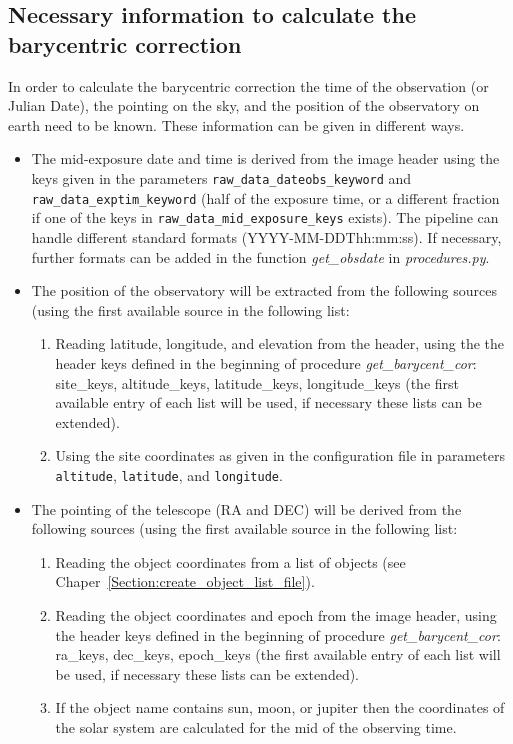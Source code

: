 \documentclass[10pt,a4paper]{article}
\begin{document}
\subsection{Necessary information to calculate the barycentric correction}
\label{Section:barycentric_correction}
In order to calculate the barycentric correction the time of the observation (or Julian Date), the pointing on the sky, and the position of the observatory on earth need to be known. These information can be given in different ways. 

\begin{itemize}
 \item The mid-exposure date and time is derived from the image header using the keys given in the parameters \verb|raw_data_dateobs_keyword| and \verb|raw_data_exptim_keyword| (half of the exposure time, or a different fraction if one of the keys in \verb|raw_data_mid_exposure_keys| exists). The pipeline can handle different standard formats (YYYY-MM-DDThh:mm:ss). If necessary, further formats can be added in the function \textit{get\_obsdate} in \textit{procedures.py}.
 \item The position of the observatory will be extracted from the following sources (using the first available source in the following list:
 \begin{enumerate}\setlength\itemsep{0em}
  \item Reading latitude, longitude, and elevation from the header, using the the header keys defined in the beginning of procedure \textit{get\_barycent\_cor}: site\_keys, altitude\_keys, latitude\_keys, longitude\_keys (the first available entry of each list will be used, if necessary these lists can be extended).
  \item Using the site coordinates as given in the configuration file in parameters \verb|altitude|, \verb|latitude|, and \verb|longitude|.
 \end{enumerate}
 \item The pointing of the telescope (RA and DEC) will be derived from the following sources (using the first available source in the following list:
 \begin{enumerate}\setlength\itemsep{0em}
  \item Reading the object coordinates from a list of objects (see Chaper~\ref{Section:create_object_list_file}).
  \item Reading the object coordinates and epoch from the image header, using the header keys defined in the beginning of procedure \textit{get\_barycent\_cor}: ra\_keys, dec\_keys, epoch\_keys (the first available entry of each list will be used, if necessary these lists can be extended).
  \item If the object name contains sun, moon, or jupiter then the coordinates of the solar system are calculated for the mid of the observing time.
 \end{enumerate}
\end{itemize}
\end{document}
